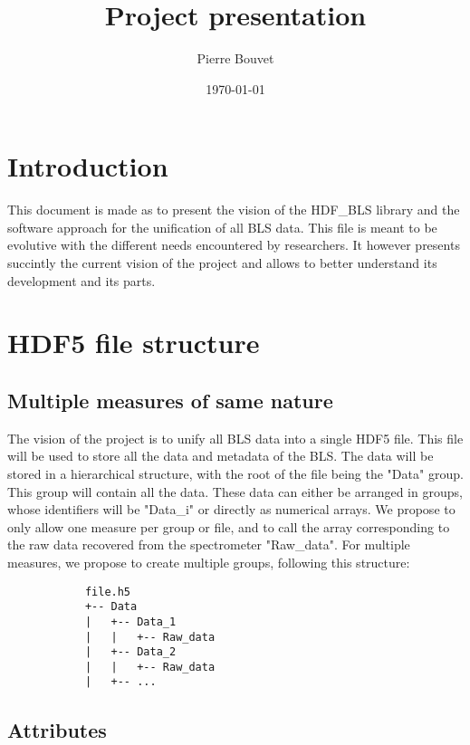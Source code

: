 \documentclass{article}
\title{Project presentation}
\author{Pierre Bouvet}
\date{\today}
\begin{document}
\maketitle


\section{Introduction}
This document is made as to present the vision of the HDF\_BLS library and the software approach for the unification of all BLS data. This file is meant to be evolutive with the different needs encountered by researchers. It however presents succintly the current vision of the project and allows to better understand its development and its parts.

\section{HDF5 file structure}

    \subsection{Multiple measures of same nature}
        The vision of the project is to unify all BLS data into a single HDF5 file. This file will be used to store all the data and metadata of the BLS. The data will be stored in a hierarchical structure, with the root of the file being the "Data" group. This group will contain all the data. These data can either be arranged in groups, whose identifiers will be "Data\_i" or directly as numerical arrays. We propose to only allow one measure per group or file, and to call the array corresponding to the raw data recovered from the spectrometer "Raw\_data". For multiple measures, we propose to create multiple groups, following this structure:

        \begin{verbatim}
            file.h5
            +-- Data
            |   +-- Data_1
            |   |   +-- Raw_data
            |   +-- Data_2
            |   |   +-- Raw_data
            |   +-- ...
        \end{verbatim}

    \subsection{Attributes}
\end{document}
